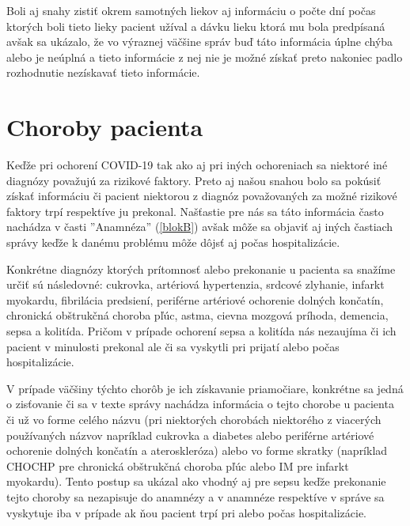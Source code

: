 Boli aj snahy zistiť okrem samotných liekov aj informáciu o počte dní počas ktorých boli tieto lieky pacient užíval a dávku lieku ktorá mu bola predpísaná avšak sa ukázalo, že vo výraznej väčšine správ buď táto informácia úplne chýba alebo je neúplná a tieto informácie z nej nie je možné získať preto nakoniec padlo rozhodnutie nezískavať tieto informácie.

\section{Choroby pacienta}

Keďže pri ochorení COVID-19 tak ako aj pri iných ochoreniach sa niektoré iné diagnózy považujú za rizikové faktory. Preto aj našou snahou bolo sa pokúsiť získať informáciu či pacient niektorou z diagnóz považovaných za možné rizikové faktory trpí respektíve ju prekonal. Našťastie pre nás sa táto informácia často nachádza v časti ''Anamnéza'' (\ref{blokB}) avšak môže sa objaviť aj iných častiach správy keďže k danému problému môže dôjsť aj počas hospitalizácie.

Konkrétne diagnózy ktorých prítomnosť alebo prekonanie u pacienta sa snažíme určiť sú následovné: cukrovka, artériová hypertenzia, srdcové zlyhanie, infarkt myokardu, fibrilácia predsiení, periférne artériové ochorenie dolných končatín, chronická obštrukčná choroba pľúc, astma, cievna mozgová príhoda, demencia, sepsa a kolitída. Pričom v prípade ochorení sepsa a kolitída nás nezaujíma či ich pacient v minulosti prekonal ale či sa vyskytli pri prijatí alebo počas hospitalizácie.

V prípade väčšiny týchto chorôb je ich získavanie priamočiare, konkrétne sa jedná o zisťovanie či sa v texte správy nachádza informácia o tejto chorobe u pacienta či už vo forme celého názvu (pri niektorých chorobách niektorého z viacerých používaných názvov napríklad cukrovka a diabetes alebo periférne artériové ochorenie dolných končatín a ateroskleróza) alebo vo forme skratky (napríklad CHOCHP pre chronická obštrukčná choroba pľúc alebo IM pre infarkt myokardu). Tento postup sa ukázal ako vhodný aj pre sepsu keďže prekonanie tejto choroby sa nezapisuje do anamnézy a v anamnéze respektíve v správe sa vyskytuje iba v prípade ak ňou pacient trpí pri alebo počas hospitalizácie.

